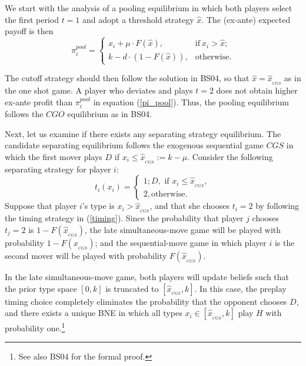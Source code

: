 \documentclass[12pt,english]{article}
\begin{document}
We start with the analysis of a pooling equilibrium in which both players select the first period $t=1$ and adopt a threshold strategy $\hat{x}$. The (ex-ante) expected payoff is then
\begin{equation}
   \pi^{pool}_{i} = 
   \begin{cases}
    x_i + \mu \cdot F(\hat{x}), &  \text{if} \  x_{i}> \hat{x};\\
    k - d \cdot (1-F(\hat{x})), & \text{otherwise}. 
   \end{cases}
   \label{pi_pool}
\end{equation}

The cutoff strategy should then follow the solution in BS04, so that $\hat{x}=\hat{x}_{_{CG0}}$ as in the one shot game. A player who deviates and plays $t=2$ does not obtain higher ex-ante profit than $\pi^{pool}_{i}$  in equation (\ref{pi_pool}). Thus, the pooling equilibrium follows the $CGO$ equilibrium as in BS04. 

Next, let us examine if there exists any separating strategy equilibrium. The candidate separating equilibrium follows the exogenous sequential game $CGS$ in which the first mover plays $D$ if $x_i\leq \hat{x}_{_{CGS}}:= k-\mu$. Consider the following separating strategy for player $i $:
\begin{equation}
 t_i(x_i)=
 \begin{cases} 1; D, \mbox{ if } x_i  \leq \hat{x}_{_{CGS}}, \\
 2,  \text{otherwise}.
 \end{cases}
 \label{timing}
\end{equation}
Suppose that player $i$'s type is $x_i >\hat{x}_{_{CGS}}$, and that she chooses $t_i=2$ by following the timing strategy  in (\ref{timing}).  Since the probability that player $j$ chooses $t_j=2$ is $1-F(\hat{x}_{_{CGS}})$, the late simultaneous-move game will be played with probability $1-F(\hat{x}_{_{CGS}})$; and the sequential-move game in which player $i$ is the second mover will be played with probability $F(\hat{x}_{_{CGS}})$.

In the late simultaneous-move game, both players will update beliefs such that the prior type space $[0, k]$ is truncated to $[\hat{x}_{_{CGS}},k]$. In this case, the preplay timing choice completely eliminates the probability that the opponent chooses $D$, and there exists a unique BNE in which all types $x_i \in [\hat{x}_{_{CGS}},k]$ play $H$ with probability one.\footnote{See also BS04 for the formal proof.} 
 
\end{document}
